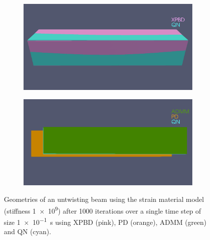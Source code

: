 \begin{figure}
    \centering
    \begin{subfigure}{0.49\textwidth}
        \includegraphics[width=\textwidth, trim={0 5.0cm 0 2.5cm}, clip]{figures/strain_beam_untwist_QN_vs_XPBD_large_ts.png}
    \end{subfigure}
    \hspace{0.001\textwidth}
    \begin{subfigure}{0.49\textwidth}
        \includegraphics[width=\textwidth, trim={0 4.5cm 0 2.15cm}, clip]{figures/strain_beam_untwist_QN_vs_ADMM_vs_PD_large_ts.png}
    \end{subfigure}
    \caption{Geometries of an untwisting beam using the strain material model (stiffness \num{1e9}) after 1000 iterations over a single time step of size 
    \SI{1e-1}{\second} using XPBD (pink), PD (orange), ADMM (green) and QN (cyan).}
    \label{fig:strain-beam-untwist-geometries-large-ts}
\end{figure}

